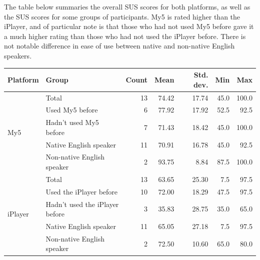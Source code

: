 \documentclass[12pt,a4paper,x11names]{article}
\begin{document}
The table below summaries the overall SUS scores for both platforms, as well as the SUS scores for some groups of participants. My5 is rated higher than the iPlayer, and of particular note is that those who had not used My5 before gave it a much higher rating than those who had not used the iPlayer before. There is not notable difference in ease of use between native and non-native English speakers.

\begin{center}
\begin{tabular}{l|l||r|r|r|r|r}
    Platform & Group & Count & Mean & Std. dev. & Min & Max \\
    \hline
    \multirow{5}{*}{My5} & Total & 13 & 74.42 & 17.74 & 45.0 & 100.0 \\
    & Used My5 before & 6 & 77.92 & 17.92 & 52.5 & 92.5 \\
    & Hadn't used My5 before & 7 & 71.43 & 18.42 & 45.0 & 100.0 \\
    & Native English speaker & 11 & 70.91 & 16.78 & 45.0 & 92.5 \\
    & Non-native English speaker & 2 & 93.75 & 8.84 & 87.5 & 100.0 \\
    \hline
    \multirow{5}{*}{iPlayer} & Total & 13 & 63.65 & 25.30 & 7.5 & 97.5 \\
    & Used the iPlayer before & 10 & 72.00 & 18.29 & 47.5 & 97.5 \\
    & Hadn't used the iPlayer before & 3 & 35.83 & 28.75 & 35.0 & 65.0 \\
    & Native English speaker & 11 & 65.05 & 27.18 & 7.5 & 97.5 \\
    & Non-native English speaker & 2 & 72.50 & 10.60 & 65.0 & 80.0 \\
    \hline
\end{tabular}
\end{center}
\end{document}
